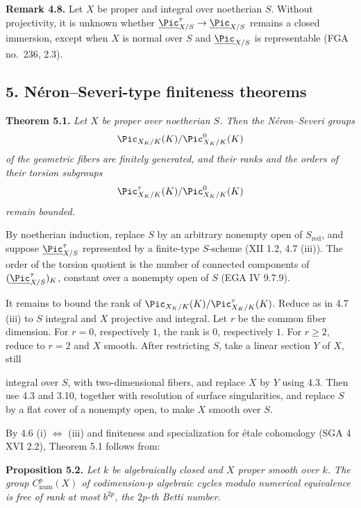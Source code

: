 \textbf{Remark 4.8.} Let \(X\) be proper and integral over noetherian
\(S\). Without projectivity, it is unknown whether
\(\underline{\Pic}^{\tau}_{X/S}\to\underline{\Pic}_{X/S}\) remains a
closed immersion, except when \(X\) is normal over \(S\) and
\(\underline{\Pic}_{X/S}\) is representable (FGA no.~236, 2.3).

\subsection*{5. N\'eron--Severi-type finiteness theorems}

\textbf{Theorem 5.1.} \emph{Let \(X\) be proper over noetherian \(S\).
Then the N\'eron--Severi groups}
\[
\Pic_{X_K/K}(K)/\Pic^0_{X_K/K}(K)
\]
\emph{of the geometric fibers are finitely generated, and their ranks
and the orders of their torsion subgroups}
\[
\Pic^\tau_{X_K/K}(K)/\Pic^0_{X_K/K}(K)
\]
\emph{remain bounded.}

By noetherian induction, replace \(S\) by an arbitrary nonempty open of
\(S_{\mathrm{red}}\), and suppose
\(\underline{\Pic}^{\tau}_{X/S}\) represented by a finite-type
\(S\)-scheme (XII 1.2, 4.7 (iii)). The order of the torsion quotient is
the number of connected components of
\((\underline{\Pic}^{\tau}_{X/S})_K\), constant over a nonempty open of
\(S\) (EGA IV 9.7.9).

It remains to bound the rank of
\(\Pic_{X_K/K}(K)/\Pic^\tau_{X_K/K}(K)\). Reduce as in 4.7 (iii) to
\(S\) integral and \(X\) projective and integral. Let \(r\) be the common
fiber dimension. For \(r=0\), respectively \(1\), the rank is \(0\),
respectively \(1\). For \(r\ge2\), reduce to \(r=2\) and \(X\) smooth.
After restricting \(S\), take a linear section \(Y\) of \(X\), still

integral over \(S\), with two-dimensional fibers, and replace \(X\) by
\(Y\) using 4.3. Then use 4.3 and 3.10, together with resolution of
surface singularities, and replace \(S\) by a flat cover of a nonempty
open, to make \(X\) smooth over \(S\).

By 4.6 (i) \(\Longleftrightarrow\) (iii) and finiteness and specialization
for \'etale cohomology (SGA 4 XVI 2.2), Theorem 5.1 follows from:

\textbf{Proposition 5.2.} \emph{Let \(k\) be algebraically closed and
\(X\) proper smooth over \(k\). The group \(C^p_{\mathrm{num}}(X)\) of
codimension-\(p\) algebraic cycles modulo numerical equivalence is free
of rank at most \(b^{2p}\), the \(2p\)-th Betti number.}

